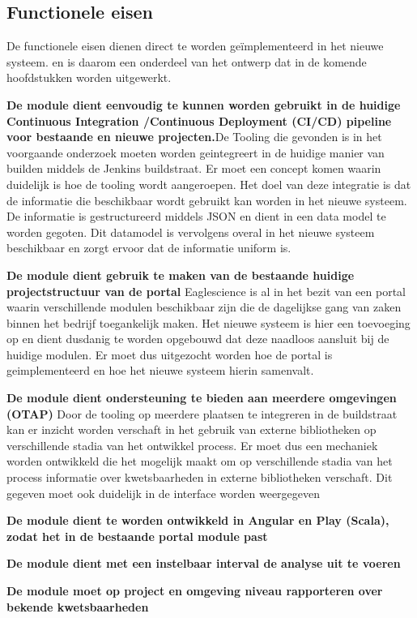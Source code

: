 \subsection{Functionele eisen}\label{subsec:functionele-eisen}
De functionele eisen dienen direct te worden geïmplementeerd in het nieuwe systeem. en is daarom een onderdeel van het ontwerp dat in de komende hoofdstukken worden uitgewerkt.

\textbf{De module dient eenvoudig te kunnen worden gebruikt in de huidige Continuous Integration /Continuous Deployment (CI/CD) pipeline voor bestaande en nieuwe projecten.}De Tooling die gevonden is in het voorgaande onderzoek moeten worden geintegreert in de huidige manier van builden middels de Jenkins buildstraat. Er moet een concept komen waarin duidelijk is hoe de tooling wordt aangeroepen. Het doel van deze integratie is dat de informatie die beschikbaar wordt gebruikt kan worden in het nieuwe systeem. De informatie is gestructureerd middels JSON en dient in een data model te worden gegoten. Dit datamodel is vervolgens overal in het nieuwe systeem beschikbaar en zorgt ervoor dat de informatie uniform is.

\textbf{De module dient gebruik te maken van de bestaande huidige projectstructuur van de portal} Eaglescience is al in het bezit van een portal waarin verschillende modulen beschikbaar zijn die de dagelijkse gang van zaken binnen het bedrijf toegankelijk maken. Het nieuwe systeem is hier een toevoeging op en dient dusdanig te worden opgebouwd dat deze naadloos aansluit bij de huidige modulen. Er moet dus uitgezocht worden hoe de portal is geimplementeerd en hoe het nieuwe systeem hierin samenvalt.

\textbf{De module dient ondersteuning te bieden aan meerdere omgevingen (OTAP)}
Door de tooling op meerdere plaatsen te integreren in de buildstraat kan er inzicht worden verschaft in het gebruik van externe bibliotheken op verschillende stadia van het ontwikkel process. Er moet dus een mechaniek worden ontwikkeld die het mogelijk maakt om op verschillende stadia van het process informatie over kwetsbaarheden in externe bibliotheken verschaft. Dit gegeven moet ook duidelijk in de interface worden weergegeven

\textbf{De module dient te worden ontwikkeld in Angular en Play (Scala), zodat het in de bestaande portal module past}

\textbf{De module dient met een instelbaar interval de analyse uit te voeren}

\textbf{De module moet op project en omgeving niveau rapporteren over bekende kwetsbaarheden}

